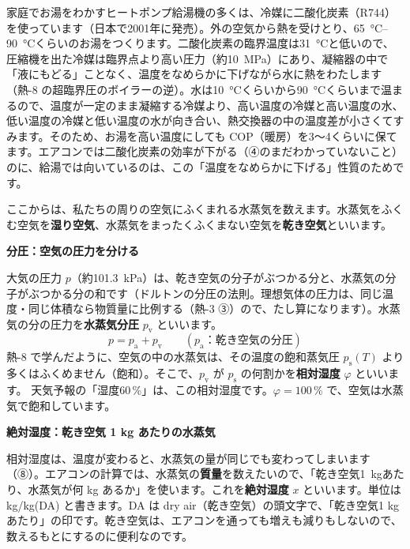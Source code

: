 \begin{motto}[4]
家庭でお湯をわかすヒートポンプ給湯機の多くは、冷媒に二酸化炭素（R744）を使っています（日本で2001年に発売）。外の空気から熱を受けとり、\qtyrange{65}{90}{\celsius}くらいのお湯をつくります。二酸化炭素の臨界温度は\qty{31}{\celsius}と低いので、圧縮機を出た冷媒は臨界点より高い圧力（約\qty{10}{MPa}）にあり、凝縮器の中で「液にもどる」ことなく、温度をなめらかに下げながら水に熱をわたします（熱-8 の超臨界圧のボイラーの逆）。水は\qty{10}{\celsius}くらいから\qty{90}{\celsius}くらいまで温まるので、温度が一定のまま凝縮する冷媒より、高い温度の冷媒と高い温度の水、低い温度の冷媒と低い温度の水が向き合い、熱交換器の中の温度差が小さくてすみます。そのため、お湯を高い温度にしても COP（暖房）を3〜4くらいに保てます。エアコンでは二酸化炭素の効率が下がる（④のまだわかっていないこと）のに、給湯では向いているのは、この「温度をなめらかに下げる」性質のためです。
\end{motto}


\leavevmode\label{ph:熱-9:sec5}ここからは、私たちの周りの空気にふくまれる水蒸気を数えます。水蒸気をふくむ空気を\textbf{湿り空気}、水蒸気をまったくふくまない空気を\textbf{乾き空気}といいます。

\noindent\textbf{分圧：空気の圧力を分ける}\par\nobreak
大気の圧力 $p$（約\qty{101.3}{kPa}）は、乾き空気の分子がぶつかる分と、水蒸気の分子がぶつかる分の和です（ドルトンの分圧の法則。理想気体の圧力は、同じ温度・同じ体積なら物質量に比例する（熱-3 ③）ので、たし算になります）。水蒸気の分の圧力を\textbf{水蒸気分圧} $p_{\mathrm v}$ といいます。
\[ p=p_{\mathrm a}+p_{\mathrm v}\qquad(p_{\mathrm a}\text{：乾き空気の分圧}) \]
熱-8 で学んだように、空気の中の水蒸気は、その温度の飽和蒸気圧 $p_{\mathrm s}(T)$ より多くはふくめません（飽和）。そこで、$p_{\mathrm v}$ が $p_{\mathrm s}$ の何割かを\textbf{相対湿度} $\varphi$ といいます。
天気予報の「湿度60\,\%」は、この相対湿度です。$\varphi=100\,\%$ で、空気は水蒸気で飽和しています。

\noindent\textbf{絶対湿度：乾き空気 1 kg あたりの水蒸気}\par\nobreak
相対湿度は、温度が変わると、水蒸気の量が同じでも変わってしまいます（⑧）。エアコンの計算では、水蒸気の\textbf{質量}を数えたいので、「乾き空気\qty{1}{kg}あたり、水蒸気が何 kg あるか」を使います。これを\textbf{絶対湿度} $x$ といいます。単位は kg/kg(DA) と書きます。DA は dry air（乾き空気）の頭文字で、「乾き空気1 kg あたり」の印です。乾き空気は、エアコンを通っても増えも減りもしないので、数えるもとにするのに便利なのです。

